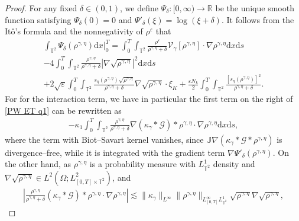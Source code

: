 \begin{proof}
For any fixed $\delta\in (0,1)$, we define $\Psi_{\delta} : [0,\infty) \rightarrow \mathbb{R} $ be the unique smooth function satisfying $\Psi_{\delta}(0) =
0 $ and $\Psi'_{\delta}(\xi) = \log(\xi + \delta)$. It follows from the It\^{o}'s formula and the nonnegativity of $\rho^{\varepsilon}$ that
\begin{align}\label{PW ET q1}
\int_{\mathbb{T}^2}\Psi_{\delta}(\rho^{\gamma, \eta})\mathrm{d}x \Big|^T_0 
= \int_0^T\int_{\mathbb{T}^2}\frac{\rho^{\varepsilon}}{\rho^{\gamma, \eta}+\delta}\mathcal{V}_{{\gamma}}[\rho^{\gamma, \eta}]\cdot\nabla\rho^{\gamma, \eta}\mathrm{d}x\mathrm{d}s
\nonumber\\
- 4\int_0^T\int_{\mathbb{T}^2}\frac{\rho^{\gamma, \eta}}{\rho^{\gamma, \eta}+\delta}
|\nabla\sqrt{\rho^{\gamma, \eta}}|^2\mathrm{d}x\mathrm{d}s \nonumber\\
+ 2\sqrt{\varepsilon}\int_0^T \int_{\mathbb{T}^2}
\frac{s_{\eta}(\rho^{\gamma, \eta})\sqrt{\rho^{\gamma, \eta}}}{\rho^{\gamma, \eta}+\delta}\nabla\sqrt{\rho^{\gamma, \eta}} \cdot \xi_{K} + \frac{\varepsilon N_k}{2}\int_{0}^{T}\int_{\mathbb{T}^2}\frac{ [s_{\eta}(\rho^{\gamma, \eta})]^2}{\rho^{\gamma, \eta}+\delta}.
\end{align}
For for the interaction term, we have in particular the first term on the right of \eqref{PW ET q1} can be rewritten as 
\begin{align*}
-\kappa_1 \int_0^T \int_{\mathbb{T}^2}\frac{\rho^{\gamma, \eta}}{\rho^{\gamma, \eta}+\delta} \nabla (\kappa_{\gamma}\ast\mathcal{G}) \ast \rho^{\gamma, \eta}\cdot\nabla\rho^{\gamma, \eta}\mathrm{d}x\mathrm{d}s,
\end{align*}
where the term with Biot--Savart kernel vanishes, since $\mathbb{J} \nabla (\kappa_{\gamma}\ast\mathcal{G} \ast \rho^{\gamma, \eta})$ is divergence--free, while it is integrated with the gradient term $\nabla \Psi'_{\delta}(\rho^{\gamma, \eta})$. On the other hand, as $\rho^{\gamma, \eta}$ is a probability measure with $L^1_{\mathbb{T}^2}$ density and $\nabla \sqrt{\rho^{\gamma, \eta}} \in L^2(\Omega; L^2_{[0,T] \times \mathbb{T}^2})$, and 
\begin{align*}
\left|\frac{\rho^{\gamma, \eta}}{\rho^{\gamma, \eta}+\delta} (\kappa_{\gamma}\ast\mathcal{G}) \ast \rho^{\gamma, \eta}\cdot\nabla \rho^{\gamma, \eta}\right| \lesssim \|\kappa_{\gamma}\|_{L^{\infty}}\|\rho^{\gamma, \eta}\|_{L^{\infty}_{[0,T]}L^1_{\mathbb{T}^2}} \sqrt{\rho^{\gamma, \eta}} \nabla \sqrt{\rho^{\gamma, \eta}},
\end{align*}

\end{proof}
